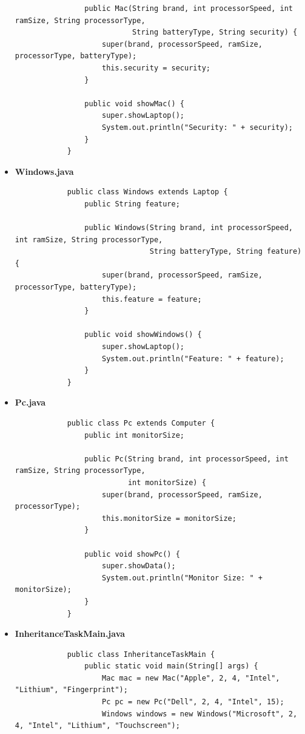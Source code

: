 \documentclass[12pt,titlepage]{article}
\begin{document}
\begin{itemize}
{\begin{verbatim}
                public Mac(String brand, int processorSpeed, int ramSize, String processorType, 
                           String batteryType, String security) {
                    super(brand, processorSpeed, ramSize, processorType, batteryType);
                    this.security = security;
                }

                public void showMac() {
                    super.showLaptop();
                    System.out.println("Security: " + security);
                }
            }
        \end{verbatim}
    }
    \item {
        \textbf{Windows.java}
        \begin{verbatim}
            public class Windows extends Laptop {
                public String feature;

                public Windows(String brand, int processorSpeed, int ramSize, String processorType,
                               String batteryType, String feature) {
                    super(brand, processorSpeed, ramSize, processorType, batteryType);
                    this.feature = feature;
                }

                public void showWindows() {
                    super.showLaptop();
                    System.out.println("Feature: " + feature);
                }
            }
        \end{verbatim}
    }
    \item {
        \textbf{Pc.java}
        \begin{verbatim}
            public class Pc extends Computer {
                public int monitorSize;

                public Pc(String brand, int processorSpeed, int ramSize, String processorType, 
                          int monitorSize) {
                    super(brand, processorSpeed, ramSize, processorType);
                    this.monitorSize = monitorSize;
                }

                public void showPc() {
                    super.showData();
                    System.out.println("Monitor Size: " + monitorSize);
                }
            }
        \end{verbatim}
    }
    \item {
        \textbf{InheritanceTaskMain.java}
        \begin{verbatim}
            public class InheritanceTaskMain {
                public static void main(String[] args) {
                    Mac mac = new Mac("Apple", 2, 4, "Intel", "Lithium", "Fingerprint");
                    Pc pc = new Pc("Dell", 2, 4, "Intel", 15);
                    Windows windows = new Windows("Microsoft", 2, 4, "Intel", "Lithium", "Touchscreen");


\end{verbatim}}
\end{itemize}
\end{document}
